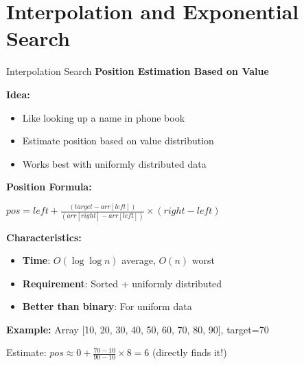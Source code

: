 \documentclass[aspectratio=169]{beamer}
\begin{document}
\section{Interpolation and Exponential Search}

\begin{frame}{Interpolation Search}
  \textbf{Position Estimation Based on Value}

  \vspace{0.3cm}
  \textbf{Idea:}
  \begin{itemize}
    \item Like looking up a name in phone book
    \item Estimate position based on value distribution
    \item Works best with uniformly distributed data
  \end{itemize}

  \vspace{0.3cm}
  \textbf{Position Formula:}
  \begin{center}
  $pos = left + \frac{(target - arr[left])}{(arr[right] - arr[left])} \times (right - left)$
  \end{center}

  \vspace{0.3cm}
  \textbf{Characteristics:}
  \begin{itemize}
    \item \textbf{Time}: $O(\log \log n)$ average, $O(n)$ worst
    \item \textbf{Requirement}: Sorted + uniformly distributed
    \item \textbf{Better than binary}: For uniform data
  \end{itemize}

  \vspace{0.3cm}
  \textbf{Example:} Array [10, 20, 30, 40, 50, 60, 70, 80, 90], target=70

  Estimate: $pos \approx 0 + \frac{70-10}{90-10} \times 8 = 6$ (directly finds it!)
\end{frame}
\end{document}

